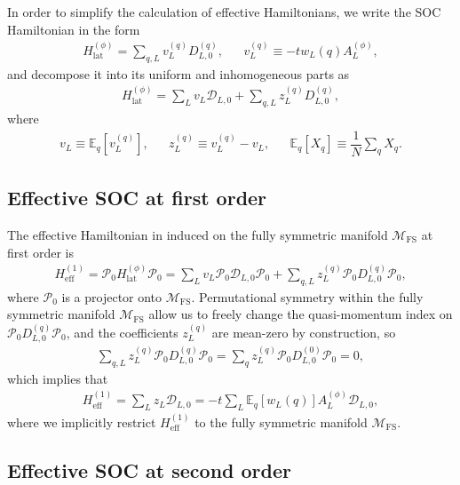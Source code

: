 \documentclass[nofootinbib,notitlepage,11pt]{revtex4-2}
\renewcommand{\t}{\text} %
\newcommand{\f}[2]{\dfrac{#1}{#2}} %
\newcommand{\p}[1]{\left(#1\right)} %
\renewcommand{\sp}[1]{\left[#1\right]} %
\newcommand{\1}{\mathds{1}}
\newcommand{\D}{\mathcal{D}}
\newcommand{\M}{\mathcal{M}}
\renewcommand{\P}{\mathcal{P}}
\newcommand{\EE}{\mathbb{E}}
\newcommand{\FS}{\text{FS}}
\begin{document}
In order to simplify the calculation of effective Hamiltonians, we
write the SOC Hamiltonian in the form
\begin{align}
  H_{\t{lat}}^{(\phi)} = \sum_{q,L} v_L^{(q)} D_{L,0}^{(q)},
  &&
  v_L^{(q)} \equiv - t w_L\p{q} A_L^{(\phi)},
\end{align}
and decompose it into its uniform and inhomogeneous parts as
\begin{align}
  H_{\t{lat}}^{(\phi)}
  = \sum_L v_L \D_{L,0} + \sum_{q,L} z_L^{(q)} D_{L,0}^{(q)},
\end{align}
where
\begin{align}
  v_L \equiv \EE_q\sp{v_L^{(q)}},
  &&
  z_L^{(q)} \equiv v_L^{(q)} - v_L,
  &&
  \EE_q\sp{X_q} \equiv \f1N \sum_q X_q.
\end{align}

\subsection{Effective SOC at first order}
\label{sec:H_eff_1}

The effective Hamiltonian in induced on the fully symmetric manifold
$\M_\FS$ at first order is
\begin{align}
  H_{\t{eff}}^{(1)}
  = \P_0 H_{\t{lat}}^{(\phi)} \P_0
  = \sum_L v_L \P_0 \D_{L,0} \P_0
  + \sum_{q,L} z_L^{(q)} \P_0 D_{L,0}^{(q)} \P_0,
\end{align}
where $\P_0$ is a projector onto $\M_\FS$.  Permutational symmetry
within the fully symmetric manifold $\M_\FS$ allow us to freely change
the quasi-momentum index on $\P_0D_{L,0}^{(q)}\P_0$, and the
coefficients $z_L^{(q)}$ are mean-zero by construction, so
\begin{align}
  \sum_{q,L} z_L^{(q)} \P_0 D_{L,0}^{(q)} \P_0
  = \sum_q z_L^{(q)} \P_0 D_{L,0}^{(0)} \P_0
  = 0,
\end{align}
which implies that
\begin{align}
  H_{\t{eff}}^{(1)}
  = \sum_L z_L \D_{L,0}
  = -t \sum_L \EE_q\sp{w_L\p{q}} A_L^{(\phi)} \D_{L,0},
  \label{eq:H_eff_1}
\end{align}
where we implicitly restrict $H_{\t{eff}}^{(1)}$ to the fully
symmetric manifold $\M_\FS$.

\subsection{Effective SOC at second order}
\label{sec:H_eff_2}
\end{document}
